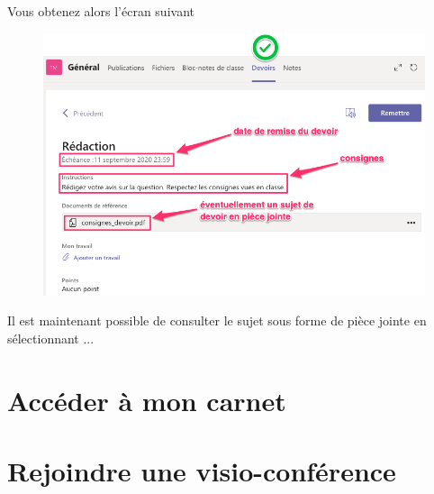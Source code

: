 \documentclass{article}
\begin{document}
\newpage
 Vous obtenez alors l'écran suivant

\begin{figure}[h]
\includegraphics[width=12cm]{devoir3.png}
\centering
\end{figure}

Il est maintenant possible de consulter le sujet sous forme de pièce jointe en sélectionnant ...

\section{Accéder à mon carnet}

\section{Rejoindre une visio-conférence}
\end{document}
